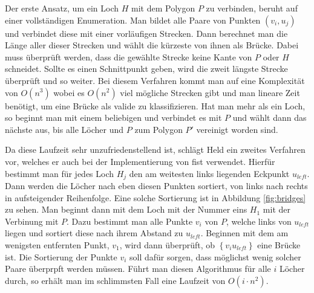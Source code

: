 Der erste Ansatz, um ein Loch $H$ mit dem Polygon $P$ zu verbinden, beruht auf einer vollständigen Enumeration. Man bildet alle Paare von Punkten $(v_i,u_j)$ und verbindet diese mit einer vorläufigen Strecken. Dann berechnet man die Länge aller dieser Strecken und wählt die kürzeste von ihnen als Brücke.
Dabei muss überprüft werden, dass die gewählte Strecke keine Kante von $P$ oder $H$ schneidet. Sollte es einen Schnittpunkt geben, wird die zweit längste Strecke überprüft und so weiter. Bei diesem Verfahren kommt man auf eine Komplexität von $O(n^3)$ wobei es $O(n^2)$ viel mögliche Strecken gibt und man 
lineare Zeit benötigt, um eine Brücke als valide zu klassifizieren. Hat man mehr als ein Loch, so beginnt man mit einem beliebigen und verbindet es mit $P$ und wählt dann das nächste aus, bis alle Löcher und $P$ zum Polygon $P'$ vereinigt worden sind.

Da diese Laufzeit sehr unzufriedenstellend ist, schlägt Held ein zweites Verfahren vor, welches er auch bei der Implementierung von \ac{fist} verwendet.
Hierfür bestimmt man für jedes Loch $H_j$ den am weitesten links liegenden Eckpunkt $u_{left}$. Dann werden die Löcher nach eben diesen Punkten sortiert, von links nach rechts in aufsteigender Reihenfolge. Eine solche Sortierung ist in Abbildung \ref{fig:bridges} zu sehen.
Man beginnt dann mit dem Loch mit der Nummer eins $H_1$ mit der Verbinung mit $P$. Dazu bestimmt man alle Punkte $v_i$ von $P$, welche links von $u_{left}$ liegen und sortiert diese nach ihrem Abstand zu $u_{left}$.
Beginnen mit dem am wenigsten entfernten Punkt, $v_1$, wird dann überprüft, ob $\left\{v_iu_{left}\right\}$ eine Brücke ist. Die Sortierung der Punkte $v_i$ soll dafür sorgen, dass möglichst wenig solcher Paare überprpft werden müssen.
Führt man diesen Algorithmus für alle $i$ Löcher durch, so erhält man im schlimmsten Fall eine Laufzeit von $O(i\cdot n^2)$.
